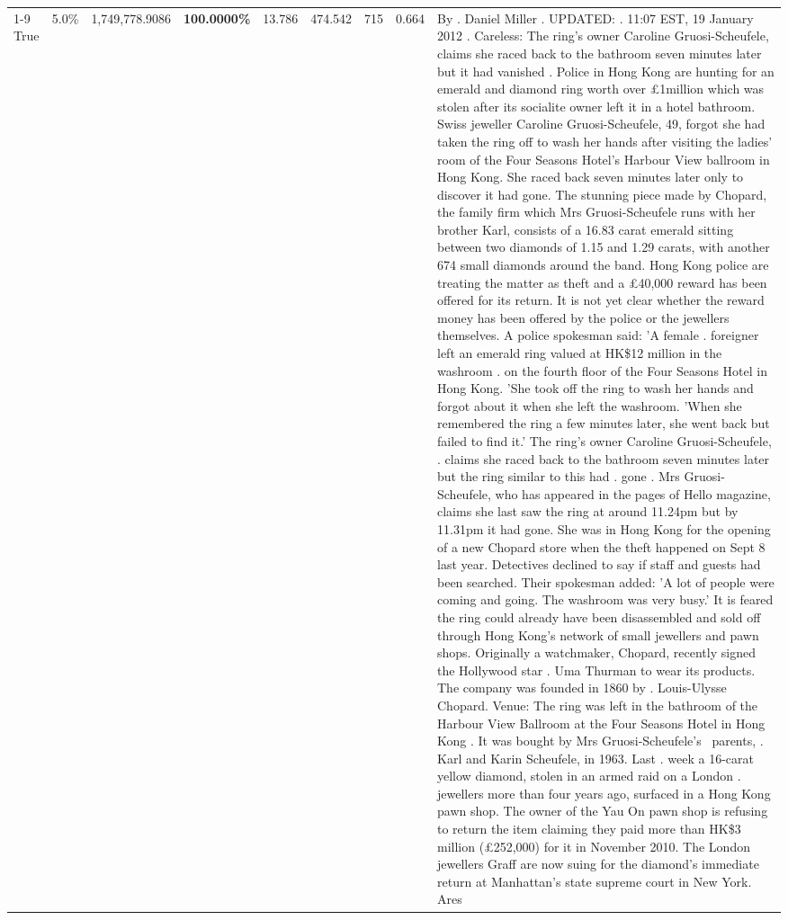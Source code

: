 \begin{table}[H]
\begin{tabular}{lllrlllll}
\cline{1-9}
True & 5.0\% & 1,749,778.9086 & \bfseries \color{red} 100.0000\% & 13.786 & 474.542 & 715 & 0.664 & By . Daniel Miller . UPDATED: . 11:07 EST, 19 January 2012 . Careless: The ring's owner Caroline Gruosi-Scheufele, claims she raced back to the bathroom seven minutes later but it had vanished . Police in Hong Kong are hunting for an emerald and diamond ring worth over £1million which was stolen after its socialite owner left it in a hotel bathroom. Swiss jeweller Caroline Gruosi-Scheufele, 49, forgot she had taken the ring off to wash her hands after visiting the ladies' room of the Four Seasons Hotel's Harbour View ballroom in Hong Kong. She raced back seven minutes later only to discover it had gone. The stunning piece made by Chopard, the family firm which Mrs Gruosi-Scheufele runs with her brother Karl, consists of a 16.83 carat emerald sitting between two diamonds of 1.15 and 1.29 carats, with another 674 small diamonds around the band. Hong Kong police are treating the matter as theft and a £40,000 reward has been offered for its return. It is not yet clear whether the reward money has been offered by the police or the jewellers themselves. A police spokesman said: 'A female . foreigner left an emerald ring valued at HK\$12 million in the washroom . on the fourth floor of the Four Seasons Hotel in Hong Kong. 'She took off the ring to wash her hands and forgot about it when she left the washroom. 'When she remembered the ring a few minutes later, she went back but failed to find it.' The ring's owner Caroline Gruosi-Scheufele, . claims she raced back to the bathroom seven minutes later but the ring similar to this had . gone . Mrs Gruosi-Scheufele, who has appeared in the pages of Hello magazine, claims she last saw the ring at around 11.24pm but by 11.31pm it had gone. She was in Hong Kong for the opening of a new Chopard store when the theft happened on Sept 8 last year. Detectives declined to say if staff and guests had been searched. Their spokesman added: 'A lot of people were coming and going. The washroom was very busy.' It is feared the ring could already have been disassembled and sold off through Hong Kong's network of small jewellers and pawn shops. Originally a watchmaker, Chopard, recently signed the Hollywood star . Uma Thurman to wear its products. The company was founded in 1860 by . Louis-Ulysse Chopard. Venue: The ring was left in the bathroom of the Harbour View Ballroom at the Four Seasons Hotel in Hong Kong . It was bought by Mrs Gruosi-Scheufele's  parents, . Karl and Karin Scheufele, in 1963. Last . week a 16-carat yellow diamond, stolen in an armed raid on a London . jewellers more than four years ago, surfaced in a Hong Kong pawn shop. The owner of the Yau On pawn shop is refusing to return the item claiming they paid more than HK\$3 million (£252,000) for it in November 2010. The London jewellers Graff are now suing for the diamond’s immediate return at Manhattan’s state supreme court in New York. Ares \\

\end{tabular}
\end{table}
